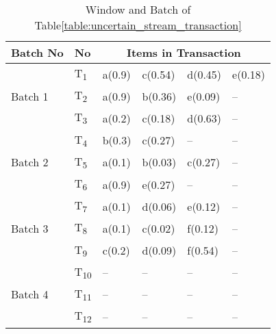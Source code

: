 %
%
\begin{table}
\centering

\begin{tabular}{|l|l|l|l|l|l|}
\hline
	Batch No& No & \multicolumn{4}{c|}{Items in Transaction} \\ \hline \hline
	\multirow{3}{*}{Batch 1}	&	T\textsubscript{1} & a(0.9) & c(0.54) & d(0.45) & e(0.18)			\\\cline{2-6}
								&	T\textsubscript{2} & a(0.9) & b(0.36) & e(0.09) & --			\\\cline{2-6}
								&	T\textsubscript{3} & a(0.2) & c(0.18) & d(0.63) & --			\\\hline
	\multirow{3}{*}{Batch 2}	&	T\textsubscript{4} & b(0.3) & c(0.27) & 	--     & --	\\\cline{2-6}
								&	T\textsubscript{5} & a(0.1) & b(0.03) & c(0.27) & --  			\\\cline{2-6}
								&	T\textsubscript{6} & a(0.9) & e(0.27) & --	   & --  			\\\hline
	\multirow{3}{*}{Batch 3}	&	T\textsubscript{7} & a(0.1) & d(0.06) & e(0.12) & --	\\\cline{2-6}
								&	T\textsubscript{8} & a(0.1) & c(0.02) & f(0.12) & --   			\\\cline{2-6}
								&	T\textsubscript{9} & c(0.2) & d(0.09) & f(0.54) & --   			\\\hline
								
	\multirow{3}{*}{Batch 4}	&	T\textsubscript{10} &  --  &  --  &  --  & --    				\\\cline{2-6}
								&	T\textsubscript{11} &  --  &  --  &  --  & --    				\\\cline{2-6}
								&	T\textsubscript{12} &  --  &  --  &  --  & --    				\\\hline
	\end{tabular}
\caption{Window and Batch of Table\ref{table:uncertain_stream_transaction}}
\label{table:prefix_assigned}
\end{table}


%
%